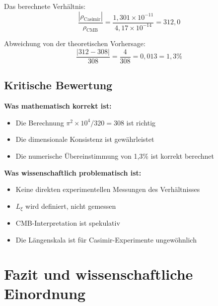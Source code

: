 \documentclass[12pt,a4paper]{article}
\begin{document}
		Das berechnete Verh\"altnis:
		\begin{equation}
			\frac{|\rho_{\text{Casimir}}|}{\rho_{\text{CMB}}} = \frac{1{,}301 \times 10^{-11}}{4{,}17 \times 10^{-14}} = 312{,}0
		\end{equation}
		
		Abweichung von der theoretischen Vorhersage:
		\begin{equation}
			\frac{|312 - 308|}{308} = \frac{4}{308} = 0{,}013 = 1{,}3\%
		\end{equation}
		
		\subsection{Kritische Bewertung}
		
		\textbf{Was mathematisch korrekt ist:}
		\begin{itemize}
			\item Die Berechnung $\pi^2 \times 10^4/320 = 308$ ist richtig
			\item Die dimensionale Konsistenz ist gew\"ahrleistet
			\item Die numerische \"Ubereinstimmung von 1{,}3\% ist korrekt berechnet
		\end{itemize}
		
		\textbf{Was wissenschaftlich problematisch ist:}
		\begin{itemize}
			\item Keine direkten experimentellen Messungen des Verh\"altnisses
			\item $L_\xi$ wird definiert, nicht gemessen
			\item CMB-Interpretation ist spekulativ
			\item Die L\"angenskala ist f\"ur Casimir-Experimente unge\-w\"ohnlich
		\end{itemize}

	
	\section{Fazit und wissenschaftliche Einordnung}
	
\end{document}
